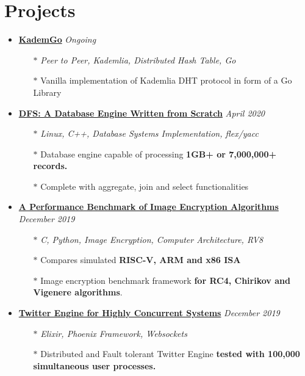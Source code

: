 \documentclass[10pt,a4paper]{article}
\begin{document}
\section{{\faCoffee} Projects}
	\begin{itemize}[noitemsep,nolistsep]

		\item{\textbf{\href{https://github.com/r0ck3r008/kademgo}{KademGo}} \hfill \textit{Ongoing}}
			\begin{itemize}[leftmargin=*]
				\setlength\itemsep{-0.25em}
				\item[$\ast$]\textit{Peer to Peer, Kademlia, Distributed Hash Table, Go}
				\item[$\ast$]Vanilla implementation of Kademlia DHT protocol in form of a Go Library
			\end{itemize}

		\item{\textbf{\href{https://github.com/r0ck3r008/database-from-scratch}{DFS: A Database Engine Written from Scratch}} \hfill \textit{April 2020}}
			\begin{itemize}[leftmargin=*]
				\setlength\itemsep{-0.25em}
				\item[$\ast$]\textit{Linux, C++, Database Systems Implementation, flex/yacc}
				\item[$\ast$]Database engine capable of processing \textbf{1GB+ or 7,000,000+ records.}
				\item[$\ast$]Complete with aggregate, join and select functionalities
			\end{itemize}

		\item{\textbf{\href{https://github.com/r0ck3r008/arch-perf-benchmark}{A Performance Benchmark of Image Encryption Algorithms}} \hfill \textit{December 2019}}
			\begin{itemize}[leftmargin=*]
				\setlength\itemsep{-0.25em}
				\item[$\ast$]\textit{C, Python, Image Encryption, Computer Architecture, RV8}
				\item[$\ast$]Compares simulated \textbf{RISC-V, ARM and x86 ISA}
				\item[$\ast$]Image encryption benchmark framework \textbf{for RC4, Chirikov and Vigenere algorithms}.
			\end{itemize}

		\item{\textbf{\href{https://github.com/r0ck3r008/twitter-engine}{Twitter Engine for Highly Concurrent Systems}} \hfill \textit{December 2019}}
			\begin{itemize}[leftmargin=*]
				\setlength\itemsep{-0.25em}
				\item[$\ast$]\textit{Elixir, Phoenix Framework, Websockets}
				\item[$\ast$]Distributed and Fault tolerant Twitter Engine \textbf{tested with 100,000 simultaneous user processes.}
			\end{itemize}


\end{itemize}
\end{document}
